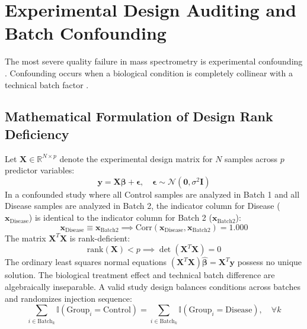 \documentclass[11pt,twoside,openright]{book}
\begin{document}
\section{Experimental Design Auditing and Batch Confounding}
\label{sec:design_auditing}

The most severe quality failure in mass spectrometry is experimental confounding \cite{leek2010tackling, goh2017why}. Confounding occurs when a biological condition is completely collinear with a technical batch factor \cite{nygaard2016methods}.

\subsection{Mathematical Formulation of Design Rank Deficiency}

Let $\mathbf{X} \in \mathbb{R}^{N \times p}$ denote the experimental design matrix for $N$ samples across $p$ predictor variables:
\begin{equation}
\mathbf{y} = \mathbf{X} \boldsymbol{\beta} + \boldsymbol{\epsilon}, \quad \boldsymbol{\epsilon} \sim \mathcal{N}(\mathbf{0}, \sigma^2 \mathbf{I})
\end{equation}
In a confounded study where all Control samples are analyzed in Batch 1 and all Disease samples are analyzed in Batch 2, the indicator column for Disease ($\mathbf{x}_{\text{Disease}}$) is identical to the indicator column for Batch 2 ($\mathbf{x}_{\text{Batch2}}$):
\begin{equation}
\mathbf{x}_{\text{Disease}} \equiv \mathbf{x}_{\text{Batch2}} \implies \text{Corr}(\mathbf{x}_{\text{Disease}}, \mathbf{x}_{\text{Batch2}}) = 1.000
\end{equation}
The matrix $\mathbf{X}^T \mathbf{X}$ is rank-deficient:
\begin{equation}
\text{rank}(\mathbf{X}) < p \implies \det(\mathbf{X}^T \mathbf{X}) = 0
\end{equation}
The ordinary least squares normal equations $(\mathbf{X}^T \mathbf{X}) \hat{\boldsymbol{\beta}} = \mathbf{X}^T \mathbf{y}$ possess no unique solution. The biological treatment effect and technical batch difference are algebraically inseparable. A valid study design balances conditions across batches and randomizes injection sequence:
\begin{equation}
\sum_{i \in \text{Batch}_k} \mathbb{I}(\text{Group}_i = \text{Control}) = \sum_{i \in \text{Batch}_k} \mathbb{I}(\text{Group}_i = \text{Disease}), \quad \forall k
\end{equation}
\end{document}

